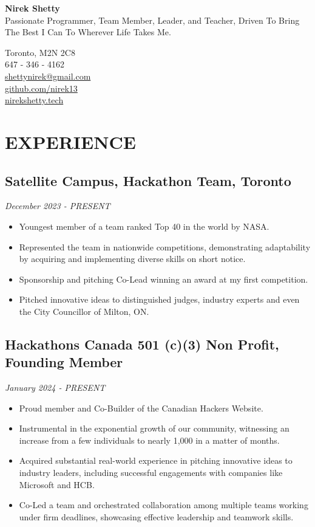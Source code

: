 \documentclass[a4paper,10pt]{article}
\begin{document}
\begin{center}
    \textbf{\huge Nirek Shetty}\\
    Passionate Programmer, Team Member, Leader, and Teacher, Driven To Bring The Best I Can To Wherever Life Takes Me.
\end{center}

\begin{center}
    Toronto, M2N 2C8 \\
    647 - 346 - 4162 \\
    \href{mailto:shettynirek@gmail.com}{shettynirek@gmail.com} \\
    \href{https://github.com/nirek13}{github.com/nirek13} \\
    \href{https://nirekshetty.tech}{nirekshetty.tech}
\end{center}

\section*{EXPERIENCE}

\subsection*{Satellite Campus, Hackathon Team, Toronto}
\textit{December 2023 - PRESENT}\\
\begin{itemize}[leftmargin=*]
    \item Youngest member of a team ranked Top 40 in the world by NASA.
    \item Represented the team in nationwide competitions, demonstrating adaptability by acquiring and implementing diverse skills on short notice.
    \item Sponsorship and pitching Co-Lead winning an award at my first competition.
    \item Pitched innovative ideas to distinguished judges, industry experts and even the City Councillor of Milton, ON.
\end{itemize}

\subsection*{Hackathons Canada 501 (c)(3) Non Profit, Founding Member}
\textit{January 2024 - PRESENT}\\
\begin{itemize}[leftmargin=*]
    \item Proud member and Co-Builder of the Canadian Hackers Website.
    \item Instrumental in the exponential growth of our community, witnessing an increase from a few individuals to nearly 1,000 in a matter of months.
    \item Acquired substantial real-world experience in pitching innovative ideas to industry leaders, including successful engagements with companies like Microsoft and HCB.
    \item Co-Led a team and orchestrated collaboration among multiple teams working under firm deadlines, showcasing effective leadership and teamwork skills.
\end{itemize}
\end{document}
